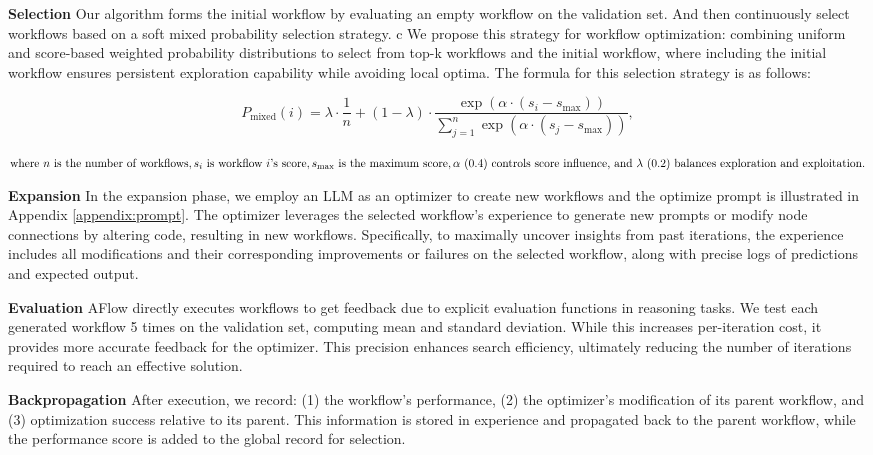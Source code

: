\documentclass{article} %
\newcommand{\model}{{\sc AFlow}\xspace}
\theoremstyle{plain}
\theoremstyle{definition}
\theoremstyle{remark}
\begin{document}
\textbf{Selection}
Our algorithm forms the initial workflow by evaluating an empty workflow on the validation set. And then continuously select workflows based on a soft mixed probability selection strategy. 
c%
We propose this strategy for workflow optimization: combining uniform and score-based weighted probability distributions to select from top-k workflows and the initial workflow, where including the initial workflow ensures persistent exploration capability while avoiding local optima. The formula for this selection strategy is as follows:

\begin{equation}
P_{\text{mixed}}(i) = \lambda \cdot \frac{1}{n} + (1 - \lambda) \cdot \frac{\exp(\alpha \cdot (s_i - s_{\text{max}}))}{\sum_{j=1}^{n} \exp(\alpha \cdot (s_j - s_{\text{max}}))},
\end{equation}

\vspace{-2pt}

$\text{where } n \text{ is the number of workflows}, s_i \text{ is workflow } i \text{'s score}, s_{\text{max}} \text{ is the maximum score}, \alpha \text{ }(0.4) \\ \text{ controls } 
\text{score influence, and } \lambda \text{ }(0.2) \text{ balances exploration and exploitation}.$

\textbf{Expansion}
In the expansion phase, we employ an LLM as an optimizer to create new workflows and the optimize prompt is illustrated in Appendix \ref{appendix:prompt}. The optimizer leverages the selected workflow's experience to generate new prompts or modify node connections by altering code, resulting in new workflows. Specifically, to maximally uncover insights from past iterations, the experience includes all modifications and their corresponding improvements or failures on the selected workflow, along with precise logs of predictions and expected output.

\textbf{Evaluation}
\model directly executes workflows to get feedback due to explicit evaluation functions in reasoning tasks. We test each generated workflow 5 times on the validation set, computing mean and standard deviation. While this increases per-iteration cost, it provides more accurate feedback for the optimizer. This precision enhances search efficiency, ultimately reducing the number of iterations required to reach an effective solution.

\textbf{Backpropagation}
After execution, we record: (1) the workflow's performance, (2) the optimizer's modification of its parent workflow, and (3) optimization success relative to its parent. This information is stored in experience and propagated back to the parent workflow, while the performance score is added to the global record for selection.
\end{document}
